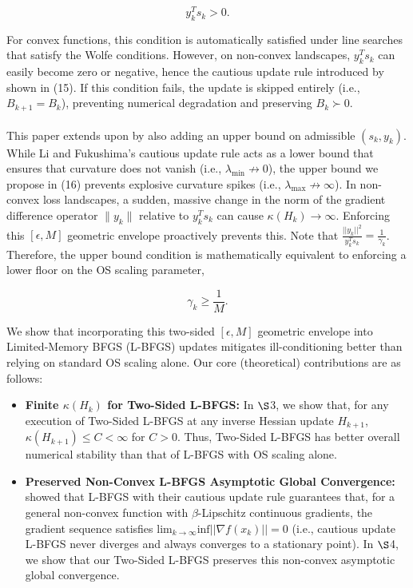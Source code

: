 \documentclass[twoside,11pt]{article}
\begin{document}
\[
y_k^T s_k > 0.
\]

\noindent
For convex functions, this condition is automatically satisfied under line searches that satisfy the Wolfe conditions. However, on non-convex landscapes, $y_k^T s_k$ can easily become zero or negative, hence the cautious update rule introduced by \cite{LF01-JCAM} shown in (15). If this condition fails, the update is skipped entirely (i.e., $B_{k+1} = B_k$), preventing numerical degradation and preserving $B_k \succ 0$. \\
\\
This paper extends upon \cite{LF01-JCAM} by also adding an upper bound on admissible $(s_k, y_k)$. While Li and Fukushima's cautious update rule acts as a lower bound that ensures that curvature does not vanish (i.e., $\lambda_{\min} \not\to 0$), the upper bound we propose in (16) prevents explosive curvature spikes (i.e., $\lambda_{\max} \not\to \infty$). In non-convex loss landscapes, a sudden, massive change in the norm of the gradient difference operator $\|y_k\|$ relative to $y_k^T s_k$ can cause $\kappa(H_k) \rightarrow \infty$. Enforcing this $[\epsilon, M]$ geometric envelope proactively prevents this. Note that $\frac{||y_k||^2}{y_k^T s_k} = \frac{1}{\gamma_k}$. Therefore, the upper bound condition is mathematically equivalent to enforcing a lower floor on the OS scaling parameter,

\begin{equation}
\gamma_k \geq \frac{1}{M}.
\end{equation}

\noindent
We show that incorporating this two-sided $[\epsilon, M]$ geometric envelope into Limited-Memory BFGS (L-BFGS) updates mitigates ill-conditioning better than relying on standard OS scaling alone. Our core (theoretical) contributions are as follows:

\begin{itemize}
    \item \textbf{Finite $\kappa(H_k)$ for Two-Sided L-BFGS:} In $\S$3, we show that, for any execution of Two-Sided L-BFGS at any inverse Hessian update $H_{k+1}$, $\kappa(H_{k+1}) \leq C < \infty$ for $C > 0$. Thus, Two-Sided L-BFGS has better overall numerical stability than that of L-BFGS with OS scaling alone.

    \item \textbf{Preserved Non-Convex L-BFGS Asymptotic Global Convergence:} \cite{LF01-SIAM} showed that L-BFGS with their cautious update rule guarantees that, for a general non-convex function with $\beta$-Lipschitz continuous gradients, the gradient sequence satisfies $\text{lim}_{k \rightarrow \infty} \text{inf}||\nabla f(x_k)|| = 0$ (i.e., cautious update L-BFGS never diverges and always converges to a stationary point). In $\S$4, we show that our Two-Sided L-BFGS preserves this non-convex asymptotic global convergence. 
\end{itemize}
\end{document}
